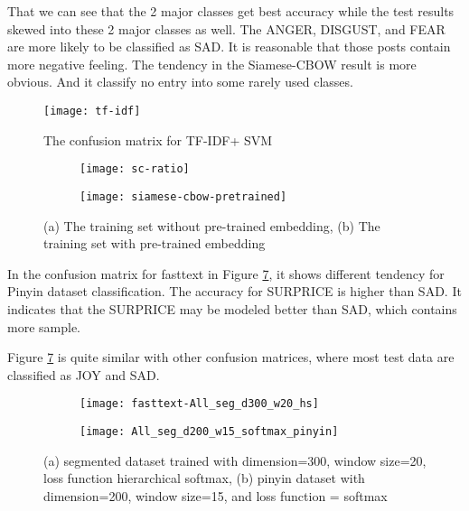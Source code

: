 That we can see that the 2 major classes get best accuracy while the test results skewed into these 2 major classes as well.  
The ANGER, DISGUST, and FEAR are more likely to be classified as SAD. It is reasonable that those posts contain more negative feeling.
The tendency in the Siamese-CBOW result is more obvious. And it classify no entry into some rarely used classes.

\begin{figure}[h]
    \centering
	\texttt{[image: tf-idf]}
    \caption{The confusion matrix for TF-IDF+ SVM}
    \label{confusion1}
\end{figure}

\begin{figure}
\centering
\begin{subfigure}[b]{1\textwidth}
   \texttt{[image: sc-ratio]}
   \caption{}
   \label{confusion2} 
\end{subfigure}

\begin{subfigure}[b]{1\textwidth}
   \texttt{[image: siamese-cbow-pretrained]}
   \caption{}
   \label{confusion5}
\end{subfigure}
\caption[Confusion Matrix of Siamese-CBOW]{(a) The training set without pre-trained embedding,
(b) The training set with pre-trained embedding
}
\end{figure}


In the confusion matrix for fasttext in Figure \ref{confusion4}, it shows different tendency for Pinyin dataset classification. 
The accuracy for SURPRICE is higher than SAD. It indicates that the SURPRICE may be modeled better than SAD, which contains more sample.

Figure \ref{confusion4} is quite similar with other confusion matrices, where most test data are classified as JOY and SAD.

\begin{figure}
\centering
\begin{subfigure}[b]{1\textwidth}
   \texttt{[image: fasttext-All\_seg\_d300\_w20\_hs]}
   \caption{}
   \label{confusion3} 
\end{subfigure}

\begin{subfigure}[b]{1\textwidth}
   \texttt{[image: All\_seg\_d200\_w15\_softmax\_pinyin]}
   \caption{}
   \label{confusion4}
\end{subfigure}
\caption[Confusion matrix of fasttext]{(a) segmented dataset trained with dimension=300, window size=20, loss function hierarchical softmax,
(b) pinyin dataset with dimension=200, window size=15, and loss function = softmax
}
\end{figure}
